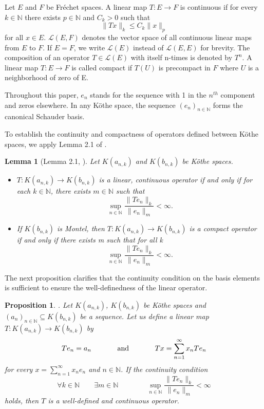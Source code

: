\documentclass{birkjour}
\newtheorem{lem}[thm]{Lemma}
\newtheorem{prop}[thm]{Proposition}
\theoremstyle{definition}
\theoremstyle{remark}
\numberwithin{equation}{section}
\begin{document}
Let $E$ and $F$ be Fr\'echet spaces. A linear map $T:E\to F$ is continuous 
if for every $k\in \mathbb{N}$ there exists $p\in \mathbb{N}$ 
and $C_k>0$ such that 
\[\|Tx\|_k\leq C_k\|x\|_p\]
for all $x\in E$.  $\mathcal{L}(E,F)$ denotes the vector space of all continuous linear maps from $E$ to $F$. If $E=F$, we write $\mathcal{L}(E)$ instead of $\mathcal{L}(E,E)$ for brevity. The composition of an operator $T\in \mathcal{L}(E)$ with itself n-times is denoted by $T^{n}$. A linear map $T: E\to F$ is called compact
if $T(U)$ is precompact in $F$ where $U$ is a neighborhood of zero of E. 

Throughout this paper, $e_{n}$ stands for the sequence with 1 in the $n^{th}$ component and zeros elsewhere. In any Köthe space, the sequence $(e_{n})_{n\in \mathbb{N}}$ forms the canonical Schauder basis.


To establish the continuity and compactness of operators defined between Köthe spaces, we apply  Lemma 2.1 of \cite{CR75}.

\begin{lem}[Lemma 2.1, \cite{CR75}]\label{Crone} 
	Let $K(a_{n,k})$ and $K(b_{n,k})$ be Köthe spaces.
	\begin{itemize}
		\item[a.] $T: K(a_{n,k}) \to K(b_{n,k})$ is a linear, continuous operator if and only if for each $k\in \mathbb{N}$, there exists $m\in \mathbb{N}$ such that
		\[ \sup_{n\in \mathbb{N}} {\frac{\|Te_{n}\|_{k}}{\|e_{n}\|_{m}}<\infty }.\]
		\item[b.] If $K(b_{n,k})$ is Montel, then $T: K(a_{n,k}) \to K(b_{n,k})$ is a compact operator if and only if there exists m such that for all k
		\[\sup_{n\in \mathbb{N}} {\frac{\|Te_{n}\|_{k}}{\|e_{n}\|_{m}}<\infty }.\]
	\end{itemize}
\end{lem}

The next proposition clarifies that the continuity condition on the basis elements is sufficient to ensure the well-definedness of the linear operator.

\begin{prop}\label{N1}\cite[Proposition 2.2]{N1}. Let $K(a_{n,k})$, $K(b_{n,k})$ be Köthe spaces and  $(a_{n})_{n\in \mathbb{N}}\subseteq K(b_{n,k})$  be a sequence. Let us define a linear map $T:K(a_{n,k})\to K(b_{n,k})$ by
	\[Te_{n}=a_{n} \hspace{0.5in}\text{and}\hspace{0.5in} Tx=\sum^{\infty}_{n=1}x_{n}Te_{n}\]
	for every $\displaystyle x=\sum^{\infty}_{n=1} x_{n}e_{n}$ and $n\in \mathbb{N}$. If the  continuity condition 
	\[\forall k\in \mathbb{N} \quad\quad \exists m\in \mathbb{N}\quad\quad\quad\quad \sup_{n\in \mathbb{N}}\frac{ \|Te_{n}\|_{k}}{\|e_{n}\|_{m}}<\infty \]
	holds, then $T$ is a well-defined and continuous operator.
\end{prop}
\end{document}
